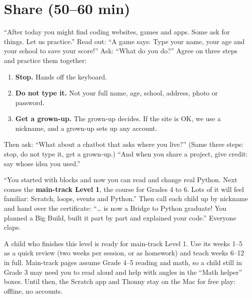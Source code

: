 \section{Share (50--60 min)}
\begin{safety}
\enquote{After today you might find coding websites, games and apps. Some ask for things. Let us practice.} Read out: \enquote{A game says: Type your name, your age and your school to save your score!} Ask: \enquote{What do you do?} Agree on three steps and practice them together:
\begin{enumerate}[leftmargin=1.4em,itemsep=0pt]
  \item \textbf{Stop.} Hands off the keyboard.
  \item \textbf{Do not type it.} Not your full name, age, school, address, photo or password.
  \item \textbf{Get a grown-up.} The grown-up decides. If the site is OK, we use a nickname, and a grown-up sets up any account.
\end{enumerate}
Then ask: \enquote{What about a chatbot that asks where you live?} (Same three steps: stop, do not type it, get a grown-up.) \enquote{And when you share a project, give credit: say whose idea you used.}
\end{safety}

\begin{teacherscript}
\enquote{You started with blocks and now you can read and change real Python. Next comes the \textbf{main-track Level 1}, the course for Grades 4 to 6. Lots of it will feel familiar: Scratch, loops, events and Python.} Then call each child up by nickname and hand over the certificate: \enquote{\ldots{} is now a Bridge to Python graduate! You planned a Big Build, built it part by part and explained your code.} Everyone claps.
\end{teacherscript}

\begin{teachernote}
A child who finishes this level is ready for main-track Level 1. Use its weeks 1--5 as a quick review (two weeks per session, or as homework) and teach weeks 6--12 in full. Main-track pages assume Grade 4--5 reading and math, so a child still in Grade 3 may need you to read aloud and help with angles in the \enquote{Math helper} boxes. Until then, the Scratch app and Thonny stay on the Mac for free play: offline, no accounts.
\end{teachernote}

